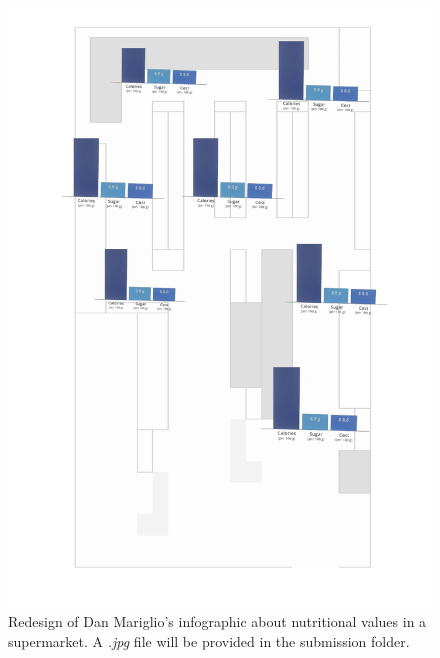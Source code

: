 \documentclass[a4paper, 11pt]{scrartcl}
\begin{document}
\begin{figure}[h]
  \centering
	\includegraphics[scale=0.15]{redesignGraphic.jpg}
	\caption{Redesign of Dan Mariglio's infographic about nutritional values in a
	supermarket. A \textit{.jpg} file will be provided in the submission folder.}
	\label{redesignGraphic}
\end{figure}
\end{document}
